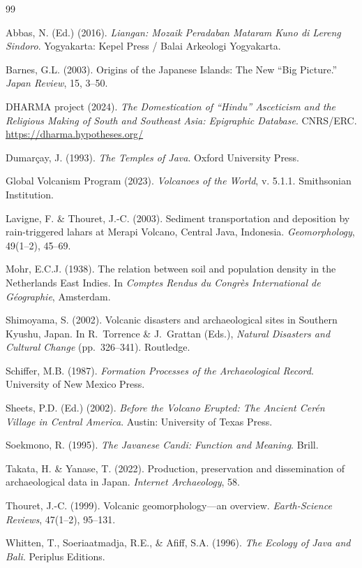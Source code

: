 \documentclass[12pt,a4paper]{article}
\begin{document}
\begin{thebibliography}{99}

Abbas, N. (Ed.) (2016). \emph{Liangan: Mozaik Peradaban Mataram Kuno di Lereng Sindoro}. Yogyakarta: Kepel Press / Balai Arkeologi Yogyakarta.

Barnes, G.L. (2003). Origins of the Japanese Islands: The New ``Big Picture.'' \emph{Japan Review}, 15, 3--50.

DHARMA project (2024). \emph{The Domestication of ``Hindu'' Asceticism and the Religious Making of South and Southeast Asia: Epigraphic Database}. CNRS/ERC. \url{https://dharma.hypotheses.org/}

Dumar\c{c}ay, J. (1993). \emph{The Temples of Java}. Oxford University Press.

Global Volcanism Program (2023). \emph{Volcanoes of the World}, v. 5.1.1. Smithsonian Institution.

Lavigne, F. \& Thouret, J.-C. (2003). Sediment transportation and deposition by rain-triggered lahars at Merapi Volcano, Central Java, Indonesia. \emph{Geomorphology}, 49(1--2), 45--69.

Mohr, E.C.J. (1938). The relation between soil and population density in the Netherlands East Indies. In \emph{Comptes Rendus du Congr\`{e}s International de G\'{e}ographie}, Amsterdam.

Shimoyama, S. (2002). Volcanic disasters and archaeological sites in Southern Kyushu, Japan. In R.\ Torrence \& J.\ Grattan (Eds.), \emph{Natural Disasters and Cultural Change} (pp.\ 326--341). Routledge.

Schiffer, M.B. (1987). \emph{Formation Processes of the Archaeological Record}. University of New Mexico Press.

Sheets, P.D. (Ed.) (2002). \emph{Before the Volcano Erupted: The Ancient Cer\'{e}n Village in Central America}. Austin: University of Texas Press.

Soekmono, R. (1995). \emph{The Javanese Candi: Function and Meaning}. Brill.

Takata, H. \& Yanase, T. (2022). Production, preservation and dissemination of archaeological data in Japan. \emph{Internet Archaeology}, 58.

Thouret, J.-C. (1999). Volcanic geomorphology---an overview. \emph{Earth-Science Reviews}, 47(1--2), 95--131.

Whitten, T., Soeriaatmadja, R.E., \& Afiff, S.A. (1996). \emph{The Ecology of Java and Bali}. Periplus Editions.

\end{thebibliography}
\end{document}

